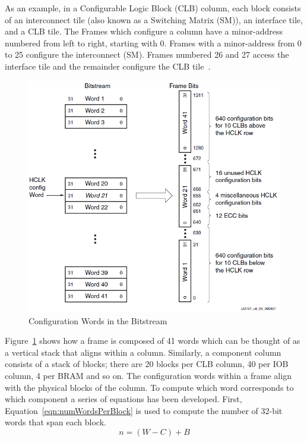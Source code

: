 \documentclass[journal, hidelinks]{IEEEtran}
\begin{document}
As an example, in a Configurable Logic Block (CLB) column, each block consists of an interconnect tile (also known as a Switching Matrix (SM)), an interface tile, and a CLB tile.
The Frames which configure a column have a minor-address numbered from left to right, starting with 0.
Frames with a minor-address from 0 to 25 configure the interconnect (SM).
Frames numbered 26 and 27 access the interface tile and the remainder configure the CLB tile~\cite{virtex5ConfigGuide}.
\begin{figure}[h]
	\centering
	\includegraphics[width=0.96\linewidth]{Figures/frameTileMap}
	\caption[Configuration Words in the Bitstream~\cite{virtex5ConfigGuide}]{Configuration Words in the Bitstream~\cite{virtex5ConfigGuide}}
	\label{fig:frameTileMap}
\end{figure}

Figure~\ref{fig:frameTileMap} shows how a frame is composed of 41 words which can be thought of as a vertical stack that aligns within a column.
Similarly, a component column consists of a stack of blocks; there are 20 blocks per CLB column, 40 per IOB column, 4 per BRAM and so on.
The configuration words within a frame align with the physical blocks of the column.
To compute which word corresponds to which component a series of equations has been developed.
First, Equation~\ref{eqn:numWordsPerBlock} is used to compute the number of 32-bit words that span each block.
\begin{equation} \label{eqn:numWordsPerBlock}
n = (W - C) + B
\end{equation}
\end{document}

